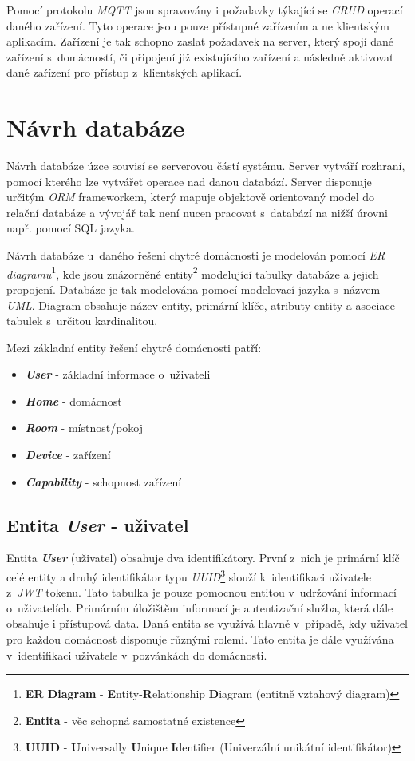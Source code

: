 Pomocí protokolu \emph{MQTT} jsou spravovány i požadavky týkající se \emph{CRUD} operací daného zařízení.
Tyto operace jsou pouze přístupné zařízením a ne klientským aplikacím.
Zařízení je tak schopno zaslat požadavek na server, který spojí dané zařízení s~domácností, či připojení již existujícího zařízení a následně aktivovat dané zařízení pro přístup z~klientských aplikací.

\newpage
\section{Návrh databáze}
\label{navrh:databaze}

Návrh databáze úzce souvisí se serverovou částí systému. Server vytváří rozhraní, pomocí kterého lze vytvářet operace nad danou databází.
Server disponuje určitým \emph{ORM} frameworkem, který mapuje objektově orientovaný model do relační databáze a vývojář tak není nucen pracovat s~databází na nižší úrovni např. pomocí SQL jazyka.

Návrh databáze u~daného řešení chytré domácnosti je modelován pomocí \emph{ER diagramu}\footnote{\textbf{ER Diagram} - \textbf{E}ntity-\textbf{R}elationship \textbf{D}iagram (entitně vztahový diagram)}, kde jsou znázorněné entity\footnote{\textbf{Entita} - věc schopná samostatné existence} modelující tabulky databáze a jejich propojení.
Databáze je tak modelována pomocí modelovací jazyka s~názvem \emph{UML}.
Diagram obsahuje název entity, primární klíče, atributy entity a asociace tabulek s~určitou kardinalitou.

Mezi základní entity řešení chytré domácnosti patří:
\begin{itemize}
  \item \textbf{\emph{User}} - základní informace o~uživateli
  \item \textbf{\emph{Home}} - domácnost
  \item \textbf{\emph{Room}} - místnost/pokoj
  \item \textbf{\emph{Device}} - zařízení
  \item \textbf{\emph{Capability}} - schopnost zařízení
\end{itemize}

\subsection*{Entita \emph{User} - uživatel}
\label{databaze:user}
Entita \textbf{\emph{User}} (uživatel) obsahuje dva identifikátory.
První z~nich je primární klíč celé entity a druhý identifikátor typu \emph{UUID}\footnote{\textbf{UUID} - \textbf{U}niversally \textbf{U}nique \textbf{I}dentifier (Univerzální unikátní identifikátor)} slouží k~identifikaci uživatele z~\emph{JWT} tokenu.
Tato tabulka je pouze pomocnou entitou v~udržování informací o~uživatelích.
Primárním úložištěm informací je autentizační služba, která dále obsahuje i přístupová data.
Daná entita se využívá hlavně v~případě, kdy uživatel pro každou domácnost disponuje různými rolemi.
Tato entita je dále využívána v~identifikaci uživatele v~pozvánkách do domácnosti.

